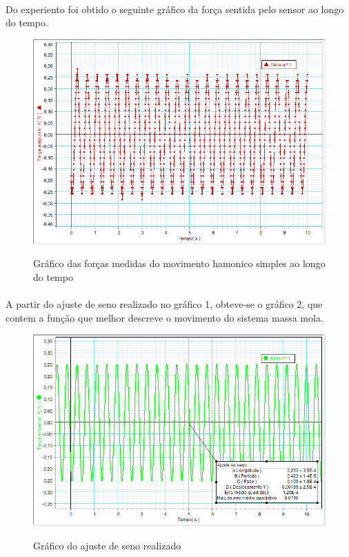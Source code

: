 \documentclass[a4paper, 12pt]{article}
\begin{document}
\paragraph{} Do experiento foi obtido o seguinte gráfico da força sentida pelo sensor ao
longo do tempo.

\begin{figure}[!htb]
    \begin{center}
        \includegraphics[scale=.60]{dados}\label{grafico 1}
        \caption{ Gráfico das forças medidas do movimento hamonico simples ao longo do tempo}
    \end{center}
\end{figure}
\newpage
\pagebreak

\paragraph{} A partir do ajuste de seno realizado no gráfico 1, obteve-se o gráfico 2, que
contem a função que melhor descreve o movimento do sistema massa mola.

\begin{figure}[!htb]
    \begin{center}
        \includegraphics[scale=.60]{Ajuste}\label{grafico 2}
        \caption{ Gráfico do ajuste de seno realizado}
    \end{center}
\end{figure}
\end{document}
